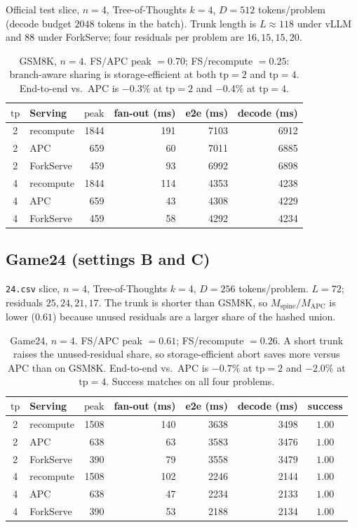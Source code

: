 \documentclass[11pt,a4paper]{article}
\begin{document}
Official test slice, $n{=}4$, Tree-of-Thoughts $k{=}4$, $D{=}512$ tokens/problem (decode budget $2048$ tokens in the batch).
Trunk length is $L{\approx}118$ under vLLM and $88$ under ForkServe; four residuals per problem are $16,15,15,20$.

\begin{table}[h]
\centering
\small
\begin{tabular}{@{}clrrrr@{}}
\toprule
$\mathrm{tp}$ & Serving & $\mathrm{peak}$ & fan-out (ms) & e2e (ms) & decode (ms) \\
\midrule
2 & recompute & 1844 & 191 & 7103 & 6912 \\
2 & APC & 659 & 60 & 7011 & 6885 \\
2 & ForkServe & 459 & 93 & 6992 & 6898 \\
4 & recompute & 1844 & 114 & 4353 & 4238 \\
4 & APC & 659 & 43 & 4308 & 4229 \\
4 & ForkServe & 459 & 58 & 4292 & 4234 \\
\bottomrule
\end{tabular}
\caption{GSM8K, $n{=}4$.
FS/APC peak ${=}0.70$; FS/recompute ${=}0.25$: branch-aware sharing is storage-efficient at both $\mathrm{tp}{=}2$ and $\mathrm{tp}{=}4$.
End-to-end vs.\ APC is $-0.3\%$ at $\mathrm{tp}{=}2$ and $-0.4\%$ at $\mathrm{tp}{=}4$.}
\end{table}

\subsection{Game24 (settings B and C)}

\texttt{24.csv} slice, $n{=}4$, Tree-of-Thoughts $k{=}4$, $D{=}256$ tokens/problem.
$L{=}72$; residuals $25,24,21,17$.
The trunk is shorter than GSM8K, so $M_{\mathrm{spine}}/M_{\mathrm{APC}}$ is lower ($0.61$) because unused residuals are a larger share of the hashed union.

\begin{table}[h]
\centering
\small
\begin{tabular}{@{}clrrrrc@{}}
\toprule
$\mathrm{tp}$ & Serving & $\mathrm{peak}$ & fan-out (ms) & e2e (ms) & decode (ms) & success \\
\midrule
2 & recompute & 1508 & 140 & 3638 & 3498 & $1.00$ \\
2 & APC & 638 & 63 & 3583 & 3476 & $1.00$ \\
2 & ForkServe & 390 & 79 & 3558 & 3479 & $1.00$ \\
4 & recompute & 1508 & 102 & 2246 & 2144 & $1.00$ \\
4 & APC & 638 & 47 & 2234 & 2133 & $1.00$ \\
4 & ForkServe & 390 & 53 & 2188 & 2134 & $1.00$ \\
\bottomrule
\end{tabular}
\caption{Game24, $n{=}4$.
FS/APC peak ${=}0.61$; FS/recompute ${=}0.26$.
A short trunk raises the unused-residual share, so storage-efficient abort saves more versus APC than on GSM8K.
End-to-end vs.\ APC is $-0.7\%$ at $\mathrm{tp}{=}2$ and $-2.0\%$ at $\mathrm{tp}{=}4$.
Success matches on all four problems.}
\end{table}
\end{document}
